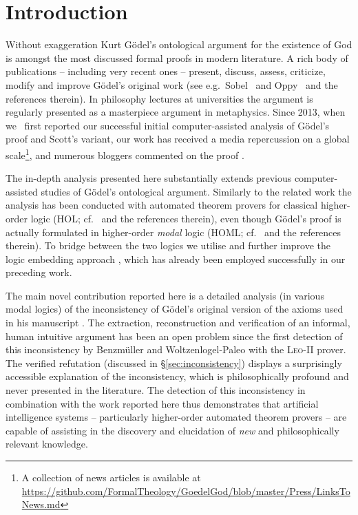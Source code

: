 \documentclass{llncs}
\begin{document}
\section{Introduction}\label{sec:introduction}
Without exaggeration Kurt G\"{o}del's ontological
argument for the existence of God \cite{GoedelNotes,ScottNotes} is
amongst the most discussed formal proofs in modern literature. A rich
body of publications -- including very recent ones -- present,
discuss, assess, criticize, modify and improve G\"{o}del's original
work (see e.g.~Sobel~\cite{sobel2004logic} and Oppy~\cite{sep-ontological-arguments} and the
references therein).  In philosophy lectures at universities the
argument is regularly presented as a masterpiece argument in
metaphysics. Since 2013, when we~\cite{J30,C40} first
reported our successful initial computer-assisted
analysis of G\"odel's proof and Scott's variant,
our work has received a media repercussion on a global scale\footnote{A
  collection of news articles is available at {\scriptsize
    \url{https://github.com/FormalTheology/GoedelGod/blob/master/Press/LinksToNews.md}}},
and numerous bloggers commented on the proof
\cite{fuhrmann15:_blogg_goedel}.

The in-depth analysis presented here substantially
extends previous computer-assisted studies of G\"odel's ontological
argument. Similarly to the related work \cite{J30,C40} the analysis has
been conducted with automated theorem provers for classical
higher-order logic (HOL; cf.~\cite{andrewsSEP} and the references
therein), even though G\"odel's proof is actually formulated in
higher-order \emph{modal} logic (HOML; cf.~\cite{homl} and the
references therein). To bridge between the two logics we utilise and
further improve the logic embedding approach \cite{J23,C40}, which has
already been employed successfully in our preceding work.

The main novel contribution reported here is a detailed
analysis (in various modal logics) of the inconsistency of G\"{o}del's
original version of the axioms used in his manuscript
\cite{GoedelNotes}. The extraction, reconstruction and
verification of an informal, human intuitive argument has been an open
problem since the first detection of this inconsistency by
Benzm\"uller and Woltzenlogel-Paleo \cite{C40} with the
\textsc{Leo-II} prover.  The verified refutation (discussed in
\S\ref{sec:inconsistency}) displays a surprisingly accessible
explanation of the inconsistency, which is philosophically profound
and never presented in the literature. The detection of this
inconsistency in combination with the work reported here thus
demonstrates that artificial intelligence systems -- particularly
higher-order automated theorem provers -- are capable of assisting in
the discovery and elucidation of \emph{new} and philosophically
relevant knowledge.
\end{document}
